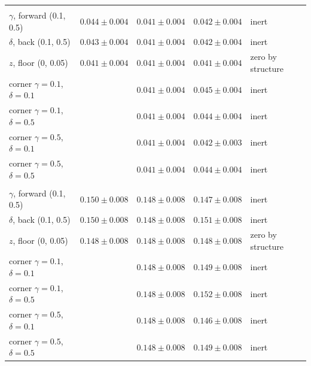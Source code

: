 \begin{table}[htbp]
\begin{tabular}{@{}P{4.4cm}>{\centering\arraybackslash}p{2.2cm}>{\centering\arraybackslash}p{2.2cm}>{\centering\arraybackslash}p{2.2cm}P{2.8cm}@{}}
\addlinespace
{} \\
$\gamma$, forward (0.1, 0.5) & $0.044 \pm 0.004$ & $0.041 \pm 0.004$ & $0.042 \pm 0.004$ & inert \\
$\delta$, back (0.1, 0.5) & $0.043 \pm 0.004$ & $0.041 \pm 0.004$ & $0.042 \pm 0.004$ & inert \\
$z$, floor (0, 0.05) & $0.041 \pm 0.004$ & $0.041 \pm 0.004$ & $0.041 \pm 0.004$ & zero by structure \\
corner $\gamma=0.1$, $\delta=0.1$ &  & $0.041 \pm 0.004$ & $0.045 \pm 0.004$ & inert \\
corner $\gamma=0.1$, $\delta=0.5$ &  & $0.041 \pm 0.004$ & $0.044 \pm 0.004$ & inert \\
corner $\gamma=0.5$, $\delta=0.1$ &  & $0.041 \pm 0.004$ & $0.042 \pm 0.003$ & inert \\
corner $\gamma=0.5$, $\delta=0.5$ &  & $0.041 \pm 0.004$ & $0.044 \pm 0.004$ & inert \\
\addlinespace
{} \\
$\gamma$, forward (0.1, 0.5) & $0.150 \pm 0.008$ & $0.148 \pm 0.008$ & $0.147 \pm 0.008$ & inert \\
$\delta$, back (0.1, 0.5) & $0.150 \pm 0.008$ & $0.148 \pm 0.008$ & $0.151 \pm 0.008$ & inert \\
$z$, floor (0, 0.05) & $0.148 \pm 0.008$ & $0.148 \pm 0.008$ & $0.148 \pm 0.008$ & zero by structure \\
corner $\gamma=0.1$, $\delta=0.1$ &  & $0.148 \pm 0.008$ & $0.149 \pm 0.008$ & inert \\
corner $\gamma=0.1$, $\delta=0.5$ &  & $0.148 \pm 0.008$ & $0.152 \pm 0.008$ & inert \\
corner $\gamma=0.5$, $\delta=0.1$ &  & $0.148 \pm 0.008$ & $0.146 \pm 0.008$ & inert \\
corner $\gamma=0.5$, $\delta=0.5$ &  & $0.148 \pm 0.008$ & $0.149 \pm 0.008$ & inert \\
\bottomrule
\end{tabular}
\end{table}
